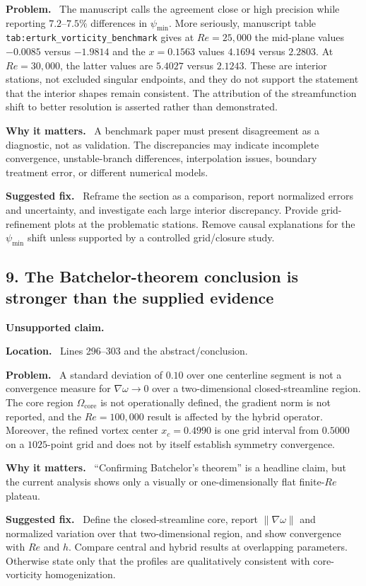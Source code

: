 \documentclass[11pt,a4paper]{article}
\newcommand{\classify}[1]{\textcolor{blue!65!black}{\textbf{#1}}}
\newcommand{\field}[1]{\par\noindent\textbf{#1}\ }
\begin{document}
\field{Problem.} The manuscript calls the agreement close or high precision while reporting $7.2$--$7.5\%$ differences in $\psi_{\min}$. More seriously, manuscript table \texttt{tab:erturk\_vorticity\_benchmark} gives at $Re=25{,}000$ the mid-plane values $-0.0085$ versus $-1.9814$ and the $x=0.1563$ values $4.1694$ versus $2.2803$. At $Re=30{,}000$, the latter values are $5.4027$ versus $2.1243$. These are interior stations, not excluded singular endpoints, and they do not support the statement that the interior shapes remain consistent. The attribution of the streamfunction shift to better resolution is asserted rather than demonstrated.

\field{Why it matters.} A benchmark paper must present disagreement as a diagnostic, not as validation. The discrepancies may indicate incomplete convergence, unstable-branch differences, interpolation issues, boundary treatment error, or different numerical models.

\field{Suggested fix.} Reframe the section as a comparison, report normalized errors and uncertainty, and investigate each large interior discrepancy. Provide grid-refinement plots at the problematic stations. Remove causal explanations for the $\psi_{\min}$ shift unless supported by a controlled grid/closure study.

\subsection*{9. The Batchelor-theorem conclusion is stronger than the supplied evidence}

\classify{Unsupported claim.}

\field{Location.} Lines 296--303 and the abstract/conclusion.

\field{Problem.} A standard deviation of $0.10$ over one centerline segment is not a convergence measure for $\nabla\omega\to0$ over a two-dimensional closed-streamline region. The core region $\Omega_{\mathrm{core}}$ is not operationally defined, the gradient norm is not reported, and the $Re=100{,}000$ result is affected by the hybrid operator. Moreover, the refined vortex center $x_c=0.4990$ is one grid interval from $0.5000$ on a $1025$-point grid and does not by itself establish symmetry convergence.

\field{Why it matters.} ``Confirming Batchelor's theorem'' is a headline claim, but the current analysis shows only a visually or one-dimensionally flat finite-$Re$ plateau.

\field{Suggested fix.} Define the closed-streamline core, report $\|\nabla\omega\|$ and normalized variation over that two-dimensional region, and show convergence with $Re$ and $h$. Compare central and hybrid results at overlapping parameters. Otherwise state only that the profiles are qualitatively consistent with core-vorticity homogenization.
\end{document}
